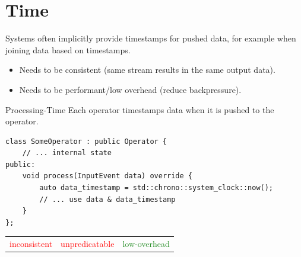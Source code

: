 \section{Time}
Systems often implicitly provide timestamps for pushed data, for example when joining data based on timestamps.
\begin{itemize}
    \item Needs to be consistent (same stream results in the same output data).
    \item Needs to be performant/low overhead (reduce backpressure).
\end{itemize}

\begin{definitionbox}{Processing-Time}
    Each operator timestamps data when it is pushed to the operator.
    \begin{verbatim}
class SomeOperator : public Operator {
    // ... internal state
public:
    void process(InputEvent data) override {
        auto data_timestamp = std::chrono::system_clock::now();
        // ... use data & data_timestamp
    }
};
    \end{verbatim}
    \begin{center}
        \begin{tabular}{c | c | c}
            \textcolor{red}{inconsistent} & \textcolor{red}{unpredicatable} & \textcolor{ForestGreen}{low-overhead} \\
        \end{tabular}
    \end{center}
\end{definitionbox}

